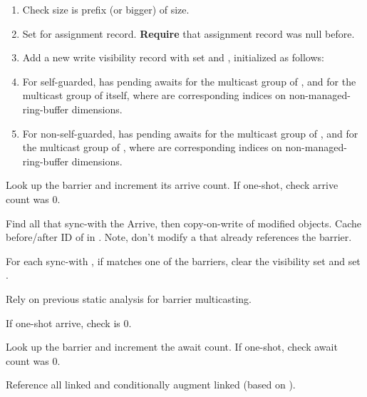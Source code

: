 \begin{enumerate}
  \item Check  size is prefix (or bigger) of  size.
  \item Set  for assignment record. \textbf{Require} that assignment record was null before.
  \item Add a new write visibility record with  set and , initialized as follows:
  \item For self-guarded,  has pending awaits for the multicast group of , and  for the multicast group of itself, where  are corresponding indices on non-managed-ring-buffer dimensions.
  \item For non-self-guarded,  has pending awaits for the multicast group of , and  for the multicast group of , where  are corresponding indices on non-managed-ring-buffer dimensions.
\end{enumerate}


Look up the barrier and increment its arrive count. If one-shot, check arrive count was 0.

Find all  that sync-with the Arrive, then copy-on-write  of modified  objects.
Cache before/after ID of  in .
Note, don't modify a  that already references the barrier.

For each sync-with , if  matches one of the barriers, clear the visibility set and set .


Rely on previous static analysis for barrier multicasting.

If one-shot arrive, check  is 0.


Look up the barrier and increment the await count. If one-shot, check await count was 0.

Reference all linked  and conditionally augment linked  (based on ).

